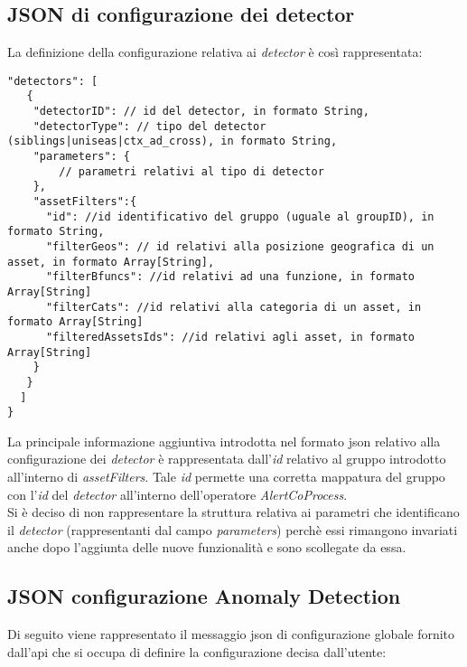 \subsection{JSON di configurazione dei detector}\label{sec:json-detectors}
La definizione della configurazione relativa ai \textit{detector} è così rappresentata:
\begin{verbatim}
"detectors": [
   {
    "detectorID": // id del detector, in formato String, 
    "detectorType": // tipo del detector (siblings|uniseas|ctx_ad_cross), in formato String, 
    "parameters": {
		// parametri relativi al tipo di detector    
    },
    "assetFilters":{
      "id": //id identificativo del gruppo (uguale al groupID), in formato String,
      "filterGeos": // id relativi alla posizione geografica di un asset, in formato Array[String],
      "filterBfuncs": //id relativi ad una funzione, in formato Array[String]
      "filterCats": //id relativi alla categoria di un asset, in formato Array[String]
      "filteredAssetsIds": //id relativi agli asset, in formato Array[String]
    }
   }
  ]
}
\end{verbatim}
La principale informazione aggiuntiva introdotta nel formato \gls{json} relativo alla configurazione dei \textit{detector} è rappresentata dall'\textit{id} relativo al gruppo introdotto all'interno di \textit{assetFilters}. Tale \textit{id} permette una corretta mappatura del gruppo con l'\textit{id} del \textit{detector} all'interno dell'operatore \textit{AlertCoProcess}.\\
Si è deciso di non rappresentare la struttura relativa ai parametri che identificano il \textit{detector} (rappresentanti dal campo \textit{parameters}) perchè essi rimangono invariati anche dopo l'aggiunta delle nuove funzionalità e sono scollegate da essa.

\subsection{JSON configurazione Anomaly Detection}
Di seguito viene rappresentato il messaggio \gls{json} di configurazione globale fornito dall'\gls{api} che si occupa di definire la configurazione decisa dall'utente:

